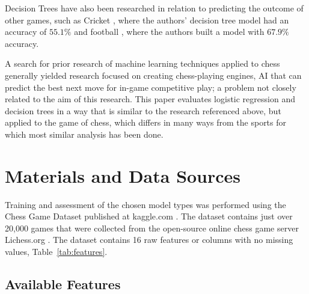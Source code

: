 \documentclass[12pt]{article}
\begin{document}
Decision Trees have also been researched in relation to predicting the outcome of other games, such as Cricket \cite{Kumar2018}, where the authors' decision tree model had an accuracy of $55.1\%$ and football \cite{Jaeyalakshmi2023}, where the authors built a model with $67.9\%$ accuracy.

A search for prior research of machine learning techniques applied to chess generally yielded research focused on creating chess-playing engines, AI that can predict the best next move for in-game competitive play; a problem not closely related to the aim of this research. This paper evaluates logistic regression and decision trees in a way that is similar to the research referenced above, but applied to the game of chess, which differs in many ways from the sports for which most similar analysis has been done.

\section{Materials and Data Sources}
\label{sec:dataset}

Training and assessment of the chosen model types was performed using the Chess Game Dataset published at kaggle.com \cite{chessDataset}. The dataset contains just over 20,000 games that were collected from the open-source online chess game server Lichess.org \cite{lichessOrg}. The dataset contains 16 raw features or columns with no missing values, Table~\ref{tab:features}.

\subsection{Available Features}
\label{sec:features}
\end{document}
